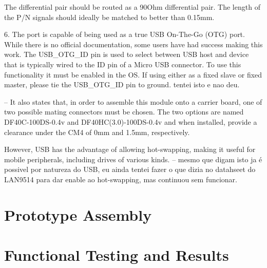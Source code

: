     The differential pair should be routed as a 90Ohm differential pair. The length of the P/N signals should ideally be matched to better than 0.15mm.

    6. The port is capable of being used as a true USB On-The-Go (OTG) port. While there is no official documentation, some users have had success making this work. The USB\_OTG\_ID pin is used to select between USB host and device that is typically wired to the ID pin of a Micro USB connector. To use this functionality it must be enabled in the OS. If using either as a fixed slave or fixed master, please tie the USB\_OTG\_ID pin to ground. tentei isto e nao deu.

	-- It also states that, in order to assemble this module onto a carrier board, one of two possible mating connectors must be chosen. The two options are named DF40C-100DS-0.4v and DF40HC(3.0)-100DS-0.4v and when installed, provide a clearance under the CM4 of 0mm and 1.5mm, respectively. 

    However, USB has the advantage of allowing hot-swapping, making it useful for mobile peripherals, including drives of various kinds. -- mesmo que digam isto ja é possivel por natureza do USB, eu ainda tentei fazer o que dizia no datahseet do LAN9514 para dar enable ao hot-swapping, mas continuou sem funcionar.

\section{Prototype Assembly}\label{sec:53_PrototypeAssembly}

\section{Functional Testing and Results}\label{sec:54_FunctionalTesting}